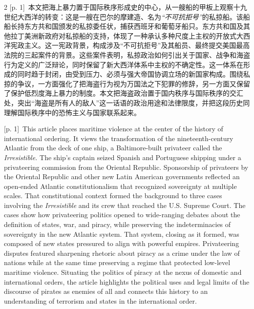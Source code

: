\documentclass[10pt,a4paper]{article}
\begin{document}
\begin{paracol}{2}
{\scriptsize\color{gray} [p. 1]}\ 本文把海上暴力置于国际秩序形成史的中心，从一艘船的甲板上观察十九世纪大西洋的转变：这是一艘在巴尔的摩建造、名为\textit{“不可抗拒号”}的私掠船。该船船长持东方共和国颁发的私掠委任状，捕获西班牙和葡萄牙船只。东方共和国及其他拉丁美洲新政府对私掠船的支持，体现了一种承认多种尺度上主权的开放式大西洋宪政主义。这一宪政背景，构成涉及“不可抗拒号”及其船员、最终提交美国最高法院的三起案件的背景。这些案件表明，私掠政治如何引出关于国家、战争和海盗行为定义的广泛辩论，同时保留了新大西洋体系中主权的不确定性。这一体系在形成的同时趋于封闭，由受到压力、必须与强大帝国协调立场的新国家构成。围绕私掠的争议，一方面强化了把海盗行为视为万国法之下犯罪的修辞，另一方面又保留了保护低烈度海上暴力的制度。本文把海盗政治置于国内秩序与国际秩序的交汇处，突出“海盗是所有人的敌人”这一话语的政治用途和法律限度，并把这段历史同理解国际秩序中的恐怖主义与国家联系起来。\par
\switchcolumn
{\scriptsize\color{gray} [p. 1]}\ This article places maritime violence at the center of the history of international ordering. It views the transformation of the nineteenth-century Atlantic from the deck of one ship, a Baltimore-built privateer called the \textit{Irresistible.} The ship’s captain seized Spanish and Portuguese shipping under a privateering commission from the Oriental Republic. Sponsorship of privateers by the Oriental Republic and other new Latin American governments reflected an open-ended Atlantic constitutionalism that recognized sovereignty at multiple scales. That constitutional context formed the background to three cases involving the \textit{Irresistible} and its crew that reached the U.S. Supreme Court. The cases show how privateering politics opened to wide-ranging debates about the definition of states, war, and piracy, while preserving the indeterminacies of sovereignty in the new Atlantic system. That system, closing as it formed, was composed of new states pressured to align with powerful empires. Privateering disputes featured sharpening rhetoric about piracy as a crime under the law of nations while at the same time preserving a regime that protected low-level maritime violence. Situating the politics of piracy at the nexus of domestic and international orders, the article highlights the political uses and legal limits of the discourse of pirates as enemies of all and connects this history to an understanding of terrorism and states in the international order.\par
\switchcolumn*

\end{paracol}
\end{document}
